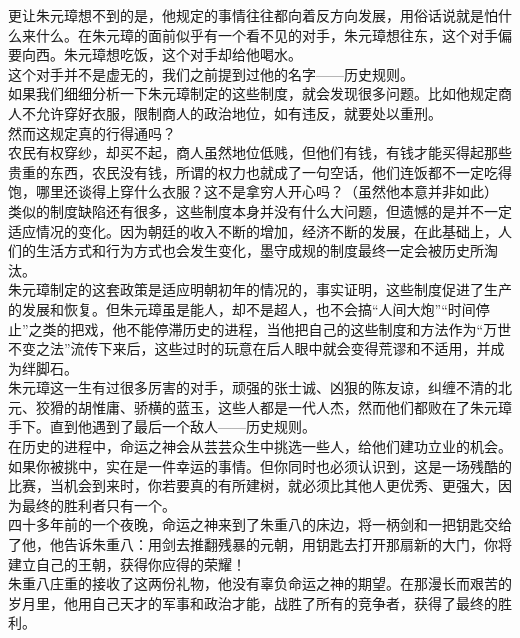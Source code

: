 \begin{multicols}{\theparacolNo}
更让朱元璋想不到的是，他规定的事情往往都向着反方向发展，用俗话说就是怕什么来什么。在朱元璋的面前似乎有一个看不见的对手，朱元璋想往东，这个对手偏要向西。朱元璋想吃饭，这个对手却给他喝水。\\

这个对手并不是虚无的，我们之前提到过他的名字——历史规则。\\

如果我们细细分析一下朱元璋制定的这些制度，就会发现很多问题。比如他规定商人不允许穿好衣服，限制商人的政治地位，如有违反，就要处以重刑。\\

然而这规定真的行得通吗？\\

农民有权穿纱，却买不起，商人虽然地位低贱，但他们有钱，有钱才能买得起那些贵重的东西，农民没有钱，所谓的权力也就成了一句空话，他们连饭都不一定吃得饱，哪里还谈得上穿什么衣服？这不是拿穷人开心吗？（虽然他本意并非如此）\\

类似的制度缺陷还有很多，这些制度本身并没有什么大问题，但遗憾的是并不一定适应情况的变化。因为朝廷的收入不断的增加，经济不断的发展，在此基础上，人们的生活方式和行为方式也会发生变化，墨守成规的制度最终一定会被历史所淘汰。\\

朱元璋制定的这套政策是适应明朝初年的情况的，事实证明，这些制度促进了生产的发展和恢复。但朱元璋虽是能人，却不是超人，也不会搞“人间大炮”“时间停止”之类的把戏，他不能停滞历史的进程，当他把自己的这些制度和方法作为“万世不变之法”流传下来后，这些过时的玩意在后人眼中就会变得荒谬和不适用，并成为绊脚石。\\

朱元璋这一生有过很多厉害的对手，顽强的张士诚、凶狠的陈友谅，纠缠不清的北元、狡猾的胡惟庸、骄横的蓝玉，这些人都是一代人杰，然而他们都败在了朱元璋手下。直到他遇到了最后一个敌人——历史规则。\\

在历史的进程中，命运之神会从芸芸众生中挑选一些人，给他们建功立业的机会。如果你被挑中，实在是一件幸运的事情。但你同时也必须认识到，这是一场残酷的比赛，当机会到来时，你若要真的有所建树，就必须比其他人更优秀、更强大，因为最终的胜利者只有一个。\\

四十多年前的一个夜晚，命运之神来到了朱重八的床边，将一柄剑和一把钥匙交给了他，他告诉朱重八：用剑去推翻残暴的元朝，用钥匙去打开那扇新的大门，你将建立自己的王朝，获得你应得的荣耀！\\

朱重八庄重的接收了这两份礼物，他没有辜负命运之神的期望。在那漫长而艰苦的岁月里，他用自己天才的军事和政治才能，战胜了所有的竞争者，获得了最终的胜利。\\


\end{multicols}
